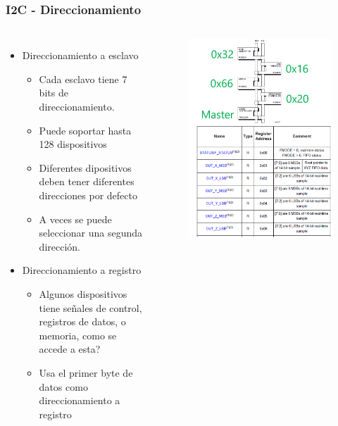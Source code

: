 \documentclass[10.5pt,scale=1.0,t,aspectratio=169,hyperref={pdfpagelabels=false}]{beamer}
\begin{document}
\begin{frame}
	\frametitle{I2C - Direccionamiento}
	{\small
	\begin{columns}
		\begin{itemize}
			\item Direccionamiento a esclavo
			\begin{itemize}
				\item Cada esclavo tiene 7 bits de direccionamiento.
				\item Puede soportar hasta 128 dispositivos
				\item Diferentes dipositivos deben tener diferentes direcciones por defecto
				\item A veces se puede seleccionar una segunda dirección. 
			\end{itemize}
			\item Direccionamiento a registro
			\begin{itemize}
				\item Algunos dispositivos tiene señales de control, registros de datos, o memoria, como se accede a esta?
				\item Usa el primer byte de datos como direccionamiento a registro
			\end{itemize} 
		\end{itemize}
		
		
		\begin{figure}
			\centering
			\includegraphics[scale=0.35]{24_I2CAddressing}
		\end{figure}
		

\end{columns}}
\end{frame}
\end{document}

